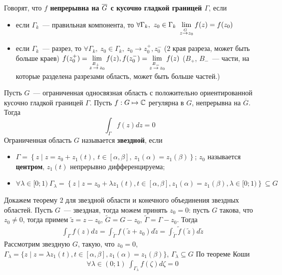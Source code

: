 Говорят, что \textbf{$f$ непрерывна на $\overline{G}$ с кусочно гладкой границей
  $\Gamma$}, если
\begin{itemize}
    \item если $\Gamma_k$~--- правильная компонента, то $\forall \Gamma_k, \ z_0
    \in \Gamma_k \ \dst \lim_{z \overset{G}{\to} z_0}f(z) = f(z_0)$
    \item если $\Gamma_k$~--- разрез, то $\forall \Gamma_k, \ z_0 \in \Gamma_k,
    \ z_0 \to z_0^+, z_0^-$ ($2$ края разреза, может быть больше краев)
    $f(z_0^+) = \displaystyle \lim_{z \overset{B_+}{\to} z_0}f(z), f(z_0^-) = \displaystyle
    \lim_{z\overset{B_-}{\to}z_0}f(z)$ ($B_+$, $B_-$~--- части, на которые
    разделена разрезами область, может быть больше частей.)
\end{itemize}
\theorem
Пусть $G$~--- ограниченная односвязная область с положительно ориентированной
кусочно гладкой границей $\Gamma$. Пусть $f: G \mapsto \mathbb{C}$ регулярна в $G$,
непрерывна на $\overline{G}$. Тогда
\begin{equation}\label{(7.4)}
  \int_{\Gamma}f(z)dz = 0
\end{equation}
\Def
Ограниченная область $G$ называется \textbf{звездной}, если
\begin{itemize}
    \item $\Gamma = \left\{z \mid z = z_0 + z_1(t), \ t \in [\alpha, \beta], \
        z_1(\alpha) = z_1(\beta) \right\}$; $z_0$ называется \textbf{центром},
    $z_1(t)$ непрерывно дифференцируема;
    \item $\forall \lambda \in [0;1) \ \Gamma_{\lambda} = \left\{ z \mid z = z_0 +
    \lambda z_1(t), t \in [\alpha, \beta], z_1(\alpha) = z_1(\beta), \lambda \in
    [0;1)\right\} \subseteq G$
\end{itemize}
Докажем теорему $2$ для звездной области и конечного объединения звездных
областей.
\pr
Пусть $G$~--- звездная, тогда можем принять $z_0=0$: пусть $G$ такова, что $z_0
\neq 0$, тогда примем $\tilde{z} = z-z_0$, $\tilde{G} = G-z_0$, $\tilde{\Gamma}
= \Gamma - z_0$. Тогда
\begin{align*}
  & \int_{\Gamma}f(z)dz = \int_{\tilde{\Gamma}}f(\tilde{z}+z_0)d\tilde{z} = \int_{\tilde{\Gamma}}\tilde{f}(\tilde{z})d\tilde{z}
\end{align*}
Рассмотрим звездную $G$, такую, что $z_0 = 0$, $\Gamma_{\lambda} = \{z \mid z =
\lambda z_1(t), t\in[\alpha, \beta], z_1(\alpha) = z_1(\beta)\}$,
$\Gamma_{\lambda}\subseteq G$
По теореме Коши 
\begin{align*}
  & \forall \lambda \in (0;1) \ \int_{\Gamma_\lambda}f(\zeta)d\zeta = 0
\end{align*}
